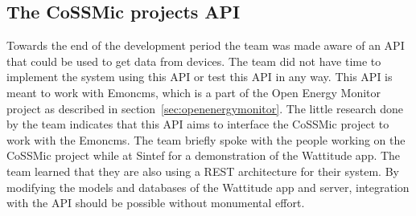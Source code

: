 \subsection{The CoSSMic projects API}
\label{sec:cossmicapi}
Towards the end of the development period the team was made aware of an API that could be used to get data from devices. The team did not have time to implement the system using this API or test this API in any way. This API is meant to work with Emoncms, which is a part of the Open Energy Monitor project as described in section~\ref{sec:openenergymonitor}. The little research done by the team indicates that this API aims to interface the CoSSMic project to work with the Emoncms. The team briefly spoke with the people working on the CoSSMic project while at Sintef for a demonstration of the Wattitude app. The team learned that they are also using a REST architecture for their system. By modifying the models and databases of the Wattitude app and server, integration with the API should be possible without monumental effort.
